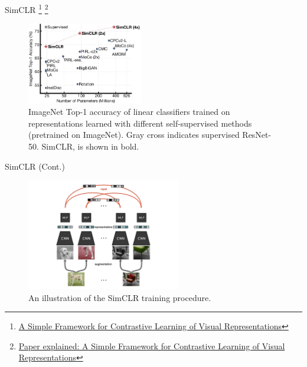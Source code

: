 \documentclass[serif, aspectratio=169]{beamer}
\begin{document}
\begin{frame}{SimCLR
\footnote{\href{https://arxiv.org/pdf/2002.05709}{A Simple Framework for Contrastive Learning of Visual Representations}}
\footnote{\href{https://towardsdatascience.com/paper-explained-a-simple-framework-for-contrastive-learning-of-visual-representations-6a2a63bfa703}{Paper explained: A Simple Framework for Contrastive Learning of Visual Representations}}}
    \begin{figure}
        \setlength{\abovecaptionskip}{0pt}
        \setlength{\belowcaptionskip}{1pt}
        \centering
        \includegraphics[width=0.45\textwidth]{pic/simclr/1.png}
        \caption{ImageNet Top-1 accuracy of linear classifiers trained on representations learned with different self-supervised methods (pretrained on ImageNet). Gray cross indicates supervised ResNet-50. SimCLR, is shown in bold.}
   \end{figure}
\end{frame}


\begin{frame}{SimCLR (Cont.)}
    \begin{figure}
        \setlength{\abovecaptionskip}{0pt}
        \setlength{\belowcaptionskip}{1pt}
        \centering
        \includegraphics[width=0.6\textwidth]{pic/simclr/2.png}
        \caption{An illustration of the SimCLR training procedure.}
   \end{figure}
\end{frame}
\end{document}
